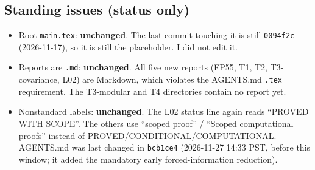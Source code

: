\documentclass[11pt]{article}
\theoremstyle{definition}
\begin{document}
\subsection{Standing issues (status only)}
\begin{itemize}
\item Root \texttt{main.tex}: \textbf{unchanged}. The last commit touching it is still
\texttt{0094f2c} (2026-11-17), so it is still the placeholder. I did not edit it.
\item Reports are \texttt{.md}: \textbf{unchanged}. All five new reports (FP55, T1, T2,
T3-covariance, L02) are Markdown, which violates the AGENTS.md \texttt{.tex}
requirement. The T3-modular and T4 directories contain no report yet.
\item Nonstandard labels: \textbf{unchanged}. The L02 status line again reads ``PROVED
WITH SCOPE''. The others use ``scoped proof'' / ``Scoped computational proofs''
instead of PROVED/CONDITIONAL/COMPUTATIONAL. AGENTS.md was last changed in
\texttt{bcb1ce4} (2026-11-27 14:33 PST, before this window; it added the mandatory
early forced-information reduction).
\end{itemize}
\end{document}
